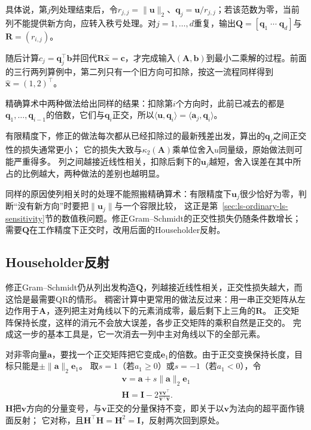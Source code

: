 具体说，第$j$列处理结束后，令$r_{j,j}=\|\bm u\|_2$、$\bm q_j=\bm u/r_{j,j}$；若该范数为零，当前列不能提供新方向，应转入秩亏处理。对$j=1,\ldots,d$重复，输出$\bm Q=[\bm q_1\;\cdots\;\bm q_d]$与$\bm R=(r_{i,j})$。

随后计算$c_j=\bm q_j^\top\bm b$并回代$\bm R\hat{\bm x}=\bm c$，才完成输入$(\bm A,\bm b)$到最小二乘解的过程。前面的三行两列算例中，第二列只有一个旧方向可扣除，按这一流程同样得到$\hat{\bm x}=(1,2)^\top$。

精确算术中两种做法给出同样的结果：扣除第$i$个方向时，此前已减去的都是$\bm q_1,\ldots,\bm q_{i-1}$的倍数，它们与$\bm q_i$正交，所以$\langle\bm u,\bm q_i\rangle=\langle\bm a_j,\bm q_i\rangle$。

有限精度下，修正的做法每次都从已经扣除过的最新残差出发，算出的$\bm q_j$之间正交性的损失通常更小；
它的损失大致与$\kappa_2(\bm A)$乘单位舍入$u$同量级，原始做法则可能严重得多。
列之间越接近线性相关，扣除后剩下的$\bm u_j$越短，舍入误差在其中所占的比例越大，两种做法的差别也越明显。

同样的原因使列相关时的处理不能照搬精确算术：有限精度下$\bm u_j$很少恰好为零，判断“没有新方向”时要把$\lVert\bm u_j\rVert$与一个容限比较，
这正是第~\ref{sec:ls-ordinary-ls-sensitivity}节的数值秩问题。修正Gram--Schmidt的正交性损失仍随条件数增长；
需要$\bm Q$在工作精度下正交时，改用后面的Householder反射。

\subsection{Householder反射}
\label{sec:ls-orthogonalization-qr}

修正Gram--Schmidt仍从列出发构造$\bm Q$，列越接近线性相关，正交性损失越大，而这恰是最需要QR的情形。
稠密计算中更常用的做法反过来：用一串正交矩阵从左边作用于$\bm A$，逐列把主对角线以下的元素消成零，最后剩下上三角的$\bm R$。
正交矩阵保持长度，这样的消元不会放大误差，各步正交矩阵的乘积自然是正交的。
完成这一步的基本工具是，它一次消去一列中主对角线以下的全部元素。

对非零向量$\bm a$，要找一个正交矩阵把它变成$\bm e_1$的倍数。由于正交变换保持长度，目标只能是$\pm\lVert\bm a\rVert_2\bm e_1$。
取$s=1$（若$a_1\geq0$）或$s=-1$（若$a_1<0$），令
\begin{equation}
\begin{gathered}
\bm v=\bm a+s\lVert\bm a\rVert_2\bm e_1\\
\bm H=\bm I-2\frac{\bm v\bm v^\top}{\bm v^\top\bm v}.
\end{gathered}
\label{eq:ls-householder}
\end{equation}
$\bm H$把$\bm v$方向的分量变号，与$\bm v$正交的分量保持不变，即关于以$\bm v$为法向的超平面作镜面反射；
它对称，且$\bm H^\top\bm H=\bm H^2=\bm I$，反射两次回到原处。

